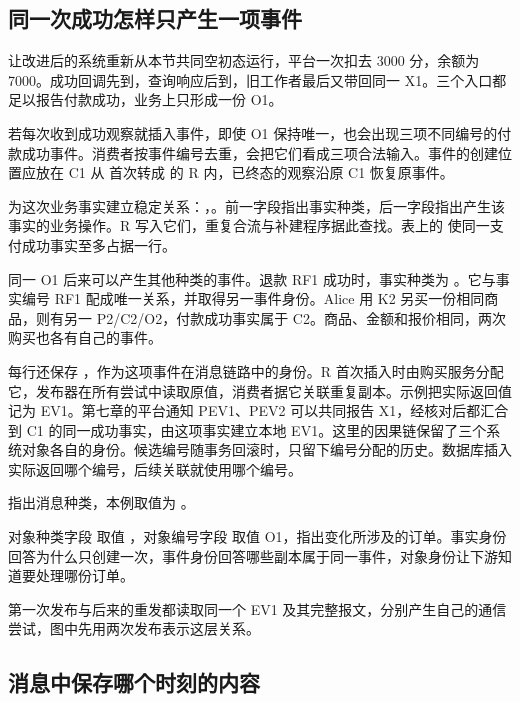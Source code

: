 \subsection*{同一次成功怎样只产生一项事件}

让改进后的系统重新从本节共同空初态运行，平台一次扣去 3000 分，余额为 7000。成功回调先到，查询响应后到，旧工作者最后又带回同一 X1。三个入口都足以报告付款成功，业务上只形成一份 O1。

若每次收到成功观察就插入事件，即使 O1 保持唯一，也会出现三项不同编号的付款成功事件。消费者按事件编号去重，会把它们看成三项合法输入。事件的创建位置应放在 C1 从  首次转成  的 R 内，已终态的观察沿原 C1 恢复原事件。

为这次业务事实建立稳定关系：，。前一字段指出事实种类，后一字段指出产生该事实的业务操作。R 写入它们，重复合流与补建程序据此查找。表上的  使同一支付成功事实至多占据一行。

同一 O1 后来可以产生其他种类的事件。退款 RF1 成功时，事实种类为 。它与事实编号 RF1 配成唯一关系，并取得另一事件身份。Alice 用 K2 另买一份相同商品，则有另一 P2/C2/O2，付款成功事实属于 C2。商品、金额和报价相同，两次购买也各有自己的事件。

每行还保存 ，作为这项事件在消息链路中的身份。R 首次插入时由购买服务分配它，发布器在所有尝试中读取原值，消费者据它关联重复副本。示例把实际返回值记为 EV1。第七章的平台通知 PEV1、PEV2 可以共同报告 X1，经核对后都汇合到 C1 的同一成功事实，由这项事实建立本地 EV1。这里的因果链保留了三个系统对象各自的身份。候选编号随事务回滚时，只留下编号分配的历史。数据库插入实际返回哪个编号，后续关联就使用哪个编号。

 指出消息种类，本例取值为 。

对象种类字段  取值 ，对象编号字段  取值 O1，指出变化所涉及的订单。事实身份回答为什么只创建一次，事件身份回答哪些副本属于同一事件，对象身份让下游知道要处理哪份订单。

第一次发布与后来的重发都读取同一个 EV1 及其完整报文，分别产生自己的通信尝试，图中先用两次发布表示这层关系。


\subsection*{消息中保存哪个时刻的内容}

